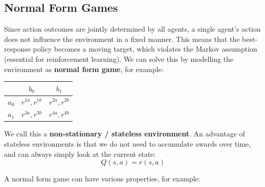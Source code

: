\documentclass[12pt]{article}
\begin{document}
\subsection{Normal Form Games}
Since action outcomes are jointly determined by all agents, a single agent's action does not influence the environment in a fixed manner.
This means that the best-response policy becomes a moving target, which violates the Markov assumption (essential for reinforcement learning).
We can solve this by modelling the environment as \textbf{normal form game}, for example:

\newpage
\begin{table}[h]
    \centering
    \begin{tabular}{c|c|c}
     & $b_0$ & $b_1$ \\ \hline
    $a_0$ & $r^{1a},r^{1b}$ & $r^{2a},r^{2b}$ \\ \hline
    $a_1$ & $r^{3a},r^{3b}$ & $r^{4a},r^{4b}$
    \end{tabular}
\end{table}

\noindent
We call this a \textbf{non-stationary / stateless environment}.
An advantage of stateless environments is that we do not need to accumulate awards over time, and can always simply look at the current state:
\[ Q(s, a) = r(s, a) \]

\noindent
A normal form game can have various properties, for example:

\begin{table}[h]
    \centering
    \hfill
    \hfill
\end{table}
\end{document}

